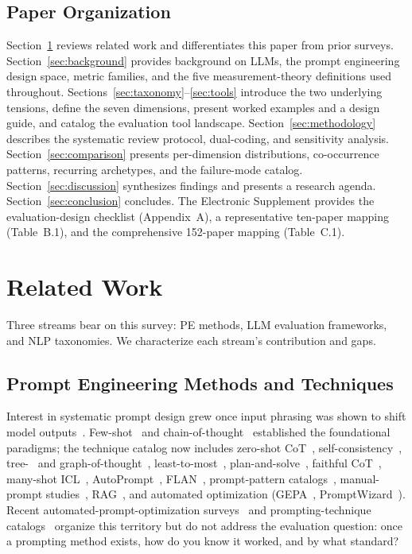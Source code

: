 \documentclass[acmsmall, nonacm, screen]{acmart}
\begin{document}
\subsection*{Paper Organization}

Section~\ref{sec:related_work} reviews related work and differentiates
this paper from prior surveys. Section~\ref{sec:background} provides
background on LLMs, the prompt engineering design space, metric
families, and the five measurement-theory definitions used throughout.
Sections~\ref{sec:taxonomy}--\ref{sec:tools} introduce the two
underlying tensions, define the seven dimensions, present worked
examples and a design guide, and catalog the evaluation tool landscape.
Section~\ref{sec:methodology} describes the systematic review protocol,
dual-coding, and sensitivity analysis. Section~\ref{sec:comparison}
presents per-dimension distributions, co-occurrence patterns, recurring
archetypes, and the failure-mode catalog. Section~\ref{sec:discussion}
synthesizes findings and presents a research agenda.
Section~\ref{sec:conclusion} concludes. The Electronic Supplement
provides the evaluation-design checklist (Appendix~A), a
representative ten-paper mapping (Table~B.1), and the comprehensive
152-paper mapping (Table~C.1).


\section{Related Work}
\label{sec:related_work}

Three streams bear on this survey: PE methods, LLM evaluation
frameworks, and NLP taxonomies. We characterize each stream's
contribution and gaps.

\subsection{Prompt Engineering Methods and Techniques}

Interest in systematic prompt design grew once input phrasing was
shown to shift model outputs~\cite{brown2020gpt3}.
Few-shot~\cite{brown2020gpt3} and
chain-of-thought~\cite{wei2022chain} established the foundational
paradigms; the technique catalog now includes zero-shot
CoT~\cite{kojima2022large},
self-consistency~\cite{wang2023selfconsistency},
tree-~\cite{yao2023tree} and graph-of-thought~\cite{graphofthoughts2023,
demystifying2024}, least-to-most~\cite{leasttomost2022},
plan-and-solve~\cite{plansolve2023}, faithful CoT~\cite{faithfulcot2023},
many-shot ICL~\cite{manyshot2024},
AutoPrompt~\cite{shin2020autoprompt}, FLAN~\cite{wei2022flan},
prompt-pattern catalogs~\cite{white2023prompt}, manual-prompt
studies~\cite{manualpromptnotdead2025}, RAG~\cite{lewis2020retrieval},
and automated optimization
(GEPA~\cite{gepa2025}, PromptWizard~\cite{promptwizard2024}). Recent automated-prompt-optimization
surveys~\cite{li2025autoprompt, ramnath2025apo} and
prompting-technique catalogs~\cite{schulhoff2024prompt,
sahoo2024systematic} organize this territory but do not address the
evaluation question: once a prompting method exists, how do you know
it worked, and by what standard?
\end{document}
